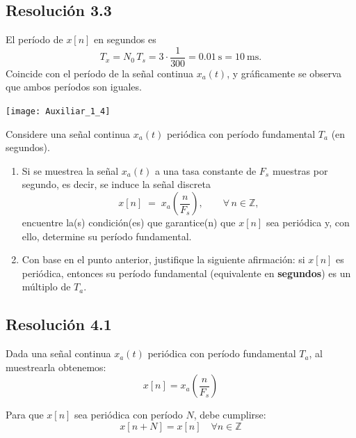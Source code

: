\documentclass[
  11pt,
  letterpaper,
   addpoints,
   answers
  ]{exam}
\begin{document}
\begin{questions}
\begin{solution}
\subsection*{Resolución 3.3}
El período de \(x[n]\) en segundos es
\begin{equation}
T_{\!x}=N_0\,T_s=3\cdot\frac{1}{300}=0.01\ \text{s}=10\ \text{ms}.
\end{equation}
Coincide con el período de la señal continua \(x_a(t)\), y gráficamente se observa que ambos períodos son iguales.
\begin{center}
  \texttt{[image: Auxiliar\_1\_4]}
\end{center}


\end{solution}

\question Considere una señal continua \(x_a(t)\) periódica con período fundamental \(T_a\) (en segundos).

\begin{enumerate}
  \item Si se muestrea la señal \(x_a(t)\) a una tasa constante de \(F_s\) muestras por segundo, es decir, se induce la señal discreta
  \begin{equation}
    x[n] \;=\; x_a\!\left(\frac{n}{F_s}\right), \qquad \forall\, n\in\mathbb{Z},
  \end{equation}
  encuentre la(s) condición(es) que garantice(n) que \(x[n]\) sea periódica y, con ello, determine su período fundamental.

  \item Con base en el punto anterior, justifique la siguiente afirmación:
  si \(x[n]\) es periódica, entonces su período fundamental (equivalente en \textbf{segundos}) es un múltiplo de \(T_a\).
\end{enumerate}

\begin{solution}

\subsection*{Resolución 4.1}

Dada una señal continua $x_a(t)$ periódica con período fundamental $T_a$, al muestrearla obtenemos:
\begin{equation}
x[n] = x_a\!\left(\frac{n}{F_s}\right)
\end{equation}

Para que $x[n]$ sea periódica con período $N$, debe cumplirse:
\begin{equation}
x[n+N] = x[n] \quad \forall n \in \mathbb{Z}
\end{equation}


\end{solution}
\end{questions}
\end{document}
